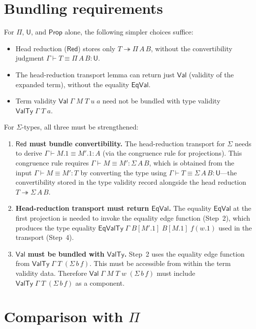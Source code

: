 \documentclass[11pt]{article}
\newcommand{\Type}{\mathsf{U}}
\newcommand{\Prop}{\mathsf{Prop}}
\newcommand{\Val}{\mathsf{Val}}
\newcommand{\EqVal}{\mathsf{EqVal}}
\newcommand{\ValTy}{\mathsf{ValTy}}
\newcommand{\EqValTy}{\mathsf{EqValTy}}
\newcommand{\HasType}{\vdash}
\newcommand{\ConvTm}{\equiv}
\newcommand{\HeadRed}{\twoheadrightarrow}
\newcommand{\pj}[2]{#1\mbox{.}#2}
\begin{document}
\section{Bundling requirements}

For $\Pi$, $\Type$, and $\Prop$ alone, the following simpler choices suffice:
\begin{itemize}
\item Head reduction ($\mathsf{Red}$) stores only $T \HeadRed \Pi\,A\,B$,
  without the convertibility judgment $\Gamma \HasType T \ConvTm \Pi\,A\,B : \Type$.
\item The head-reduction transport lemma can return just $\Val$
  (validity of the expanded term), without the equality $\EqVal$.
\item Term validity $\Val\;\Gamma\;M\;T\;u\;a$ need not be bundled with
  type validity $\ValTy\;\Gamma\;T\;a$.
\end{itemize}
For $\Sigma$-types, all three must be strengthened:
\begin{enumerate}
\item \textbf{$\mathsf{Red}$ must bundle convertibility.}
  The head-reduction transport for $\Sigma$ needs to derive
  $\Gamma \HasType \pj{M}{1} \ConvTm \pj{M'}{1} : A$ (via the congruence
  rule for projections).  This congruence rule requires
  $\Gamma \HasType M \ConvTm M' : \Sigma\,A\,B$, which is obtained from
  the input $\Gamma \HasType M \ConvTm M' : T$ by converting the type using
  $\Gamma \HasType T \ConvTm \Sigma\,A\,B : \Type$---the convertibility
  stored in the type validity record alongside the head reduction
  $T \HeadRed \Sigma\,A\,B$.

\item \textbf{Head-reduction transport must return $\EqVal$.}
  The equality $\EqVal$ at the first projection is needed to invoke
  the equality edge function (Step~2), which produces the type equality
  $\EqValTy\;\Gamma\;B[\pj{M'}{1}]\;B[\pj{M}{1}]\;f(\pj{w}{1})$ used
  in the transport (Step~4).

\item \textbf{$\Val$ must be bundled with $\ValTy$.}
  Step~2 uses the equality edge function from $\ValTy\;\Gamma\;T\;(\Sigma\,b\,f)$.
  This must be accessible from within the term validity data.
  Therefore $\Val\;\Gamma\;M\;T\;w\;(\Sigma\,b\,f)$ must include
  $\ValTy\;\Gamma\;T\;(\Sigma\,b\,f)$ as a component.
\end{enumerate}

\section{Comparison with $\Pi$}
\end{document}
